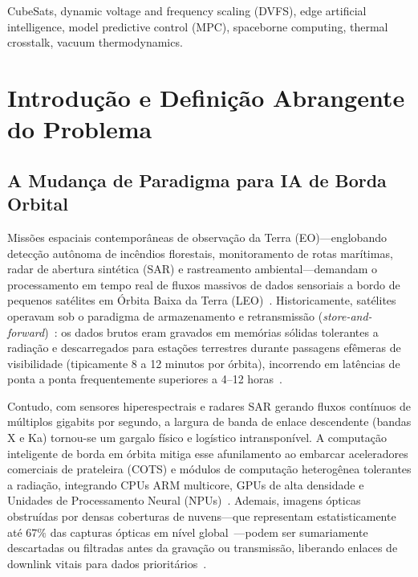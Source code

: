 \documentclass[journal]{IEEEtran}
\begin{document}
\begin{IEEEkeywords}
CubeSats, dynamic voltage and frequency scaling (DVFS), edge artificial intelligence, model predictive control (MPC), spaceborne computing, thermal crosstalk, vacuum thermodynamics.
\end{IEEEkeywords}

\section{Introdução e Definição Abrangente do Problema}

\subsection{A Mudança de Paradigma para IA de Borda Orbital}
Missões espaciais contemporâneas de observação da Terra (EO)---englobando detecção autônoma de incêndios florestais, monitoramento de rotas marítimas, radar de abertura sintética (SAR) e rastreamento ambiental---demandam o processamento em tempo real de fluxos massivos de dados sensoriais a bordo de pequenos satélites em Órbita Baixa da Terra (LEO)~\cite{denby2020asplos, garrett2024taes, chen2026sagin}. Historicamente, satélites operavam sob o paradigma de armazenamento e retransmissão (\textit{store-and-forward})~\cite{manson1966fatigue, ecss2008thermal}: os dados brutos eram gravados em memórias sólidas tolerantes a radiação e descarregados para estações terrestres durante passagens efêmeras de visibilidade (tipicamente 8 a 12 minutos por órbita), incorrendo em latências de ponta a ponta frequentemente superiores a 4--12 horas~\cite{denby2020asplos, garrett2024taes}.

Contudo, com sensores hiperespectrais e radares SAR gerando fluxos contínuos de múltiplos gigabits por segundo, a largura de banda de enlace descendente (bandas X e Ka) tornou-se um gargalo físico e logístico intransponível. A computação inteligente de borda em órbita mitiga esse afunilamento ao embarcar aceleradores comerciais de prateleira (COTS) e módulos de computação heterogênea tolerantes a radiação, integrando CPUs ARM multicore, GPUs de alta densidade e Unidades de Processamento Neural (NPUs)~\cite{garrett2024taes, sherwood2003ase}. Ademais, imagens ópticas obstruídas por densas coberturas de nuvens---que representam estatisticamente até $67\%$ das capturas ópticas em nível global~\cite{king2013spatial}---podem ser sumariamente descartadas ou filtradas antes da gravação ou transmissão, liberando enlaces de downlink vitais para dados prioritários~\cite{giuffrida2021phisat1}.
\end{document}
